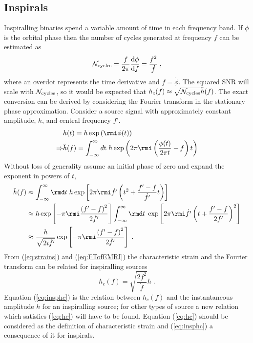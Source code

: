 \subsection{Inspirals}\label{sec:insp}
Inspiralling binaries spend a variable amount of time in each frequency band. If $\phi$ is the orbital phase then the number of cycles generated at frequency $f$ can be estimated as
\begin{equation}\label{eq:inspiral} {\cal{N}}_{\textrm{cycles}} = \frac{f}{2\pi}\frac{\textrm{d}\phi}{\textrm{d}f}=\frac{f^{2}}{\dot{f}} \; ,\end{equation}
where an overdot represents the time derivative and $f=\dot{\phi}$. The squared SNR will scale with ${\cal{N}}_{\textrm{cycles}}$, so it would be expected that $h_{c}(f)\approx \sqrt{{\cal{N}}_{\textrm{cycles}}}\tilde{h}(f)$. The exact conversion can be derived by considering the Fourier transform in the stationary phase approximation. Consider a source signal with approximately constant amplitude, $h$, and central frequency $f'$.
\begin{eqnarray}&h(t)= h\exp\left(\rmi \phi(t)\right) \\
\Rightarrow &\tilde{h}(f)=\int_{-\infty}^{\infty}d\textrm{t}\;h\exp \left(2\pi \rmi \left(\frac{\phi(t)}{2\pi t}-f\right)t\right)\end{eqnarray}
Without loss of generality assume an initial phase of zero and expand the exponent in powers of $t$,
\begin{eqnarray} \label{eq:FTofEMRI} \tilde{h}(f) &\approx \int_{-\infty}^{\infty}\rmd t\; h \exp\left[2\pi\rmi \dot{f'} \left(t^{2}+\frac{f'-f}{\dot{f'}}t\right)\right]\nonumber \\
&\approx h\exp\left[-\pi\rmi\frac{\left(f'-f\right)^{2}}{2\dot{f'}}\right]\int_{-\infty}^{\infty}\rmd t\;\exp\left[2\pi\rmi\dot{f'}\left(t+\frac{f'-f}{2\dot{f'}}\right)^{2}\right] \nonumber \\
&\approx\frac{h}{\sqrt{2i\dot{f'}}}\exp\left[-\pi\rmi\frac{\left(f'-f\right)^{2}}{2\dot{f'}}\right]\; .
\end{eqnarray}
From (\ref{eq:strains}) and (\ref{eq:FTofEMRI}) the characteristic strain and the Fourier transform can be related for inspiralling sources \citep{FinnThorne}
\begin{equation}\label{eq:insphc}h_{c}(f) = \sqrt{\frac{2f^{2}}{\dot{f}}}h\;.\end{equation}
Equation (\ref{eq:insphc}) is the relation between $h_{c}(f)$ and the instantaneous amplitude $h$ for an inspiralling source; for other types of source a new relation which satisfies (\ref{eq:hc}) will have to be found. Equation (\ref{eq:hc}) should be considered as the definition of characteristic strain and (\ref{eq:insphc}) a consequence of it for inspirals.





